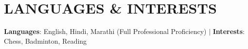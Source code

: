 \documentclass[letterpaper,10.5pt]{article}
\begin{document}
\section{LANGUAGES \& INTERESTS}
 \begin{itemize}[leftmargin=0.15in, label={}]
    \small{\item{
     \textbf{Languages}{: English, Hindi, Marathi (Full Professional Proficiency)} \hspace{15pt} $|$ \hspace{15pt} \textbf{Interests}{: Chess, Badminton, Reading}
    }}
 \end{itemize}
\end{document}
